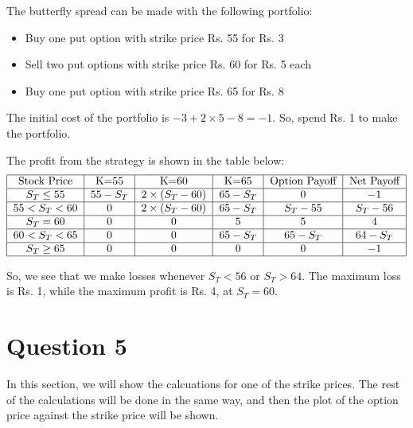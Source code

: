 \documentclass[a4paper]{article}
\begin{document}
The butterfly spread can be made with the following portfolio:
\begin{itemize}
    \item Buy one put option with strike price Rs. 55 for Rs. 3
    \item Sell two put options with strike price Rs. 60 for Rs. 5 each
    \item Buy one put option with strike price Rs. 65 for Rs. 8
\end{itemize}

The initial cost of the portfolio is $- 3 + 2 \times 5 - 8 = -1$. So, spend Rs. 1 to make the portfolio.

The profit from the strategy is shown in the table below:
\begin{align*}
    \begin{tabular}{|c|c|c|c|c|c|}
        \hline
        Stock Price & K=55 & K=60 & K=65 & Option Payoff & Net Payoff \\
        \hline
        $S_T \leq 55$ & $55 - S_T$ & $2 \times (S_T - 60)$ & $65 - S_T$ & $0$ & $-1$\\
        \hline
        $55 < S_T < 60$ & $0$ & $2 \times (S_T - 60)$ & $65 - S_T$ & $S_T - 55$ & $S_T - 56$ \\
        \hline
        $S_T = 60$ & $0$ & $0$ & $5$ & $5$ & $4$ \\
        \hline
        $60 < S_T < 65$ & $0$ & $0$ & $65 - S_T$ & $65 - S_T$ & $64 - S_T$ \\
        \hline
        $S_T \geq 65$ & $0$ & $0$ & $0$ & $0$ & $-1$ \\
        \hline
    \end{tabular}
\end{align*}

So, we see that we make losses whenever $S_T < 56$ or $S_T > 64$. The maximum loss is Rs. 1, while the maximum profit is Rs. 4, at $S_T = 60$.


\vspace{10mm}
\section*{Question 5}

In this section, we will show the calcuations for one of the strike prices. The rest of the calculations will be done in the same way, and then the plot of the option price against the strike price will be shown. \\
\end{document}
